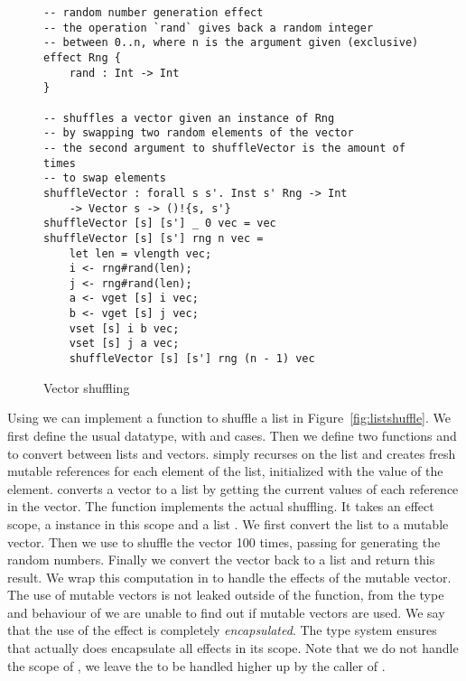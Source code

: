 \begin{figure}[H]
\caption{Vector shuffling}
\begin{verbatim}
-- random number generation effect
-- the operation `rand` gives back a random integer
-- between 0..n, where n is the argument given (exclusive)
effect Rng {
	rand : Int -> Int
}

-- shuffles a vector given an instance of Rng
-- by swapping two random elements of the vector
-- the second argument to shuffleVector is the amount of times
-- to swap elements
shuffleVector : forall s s'. Inst s' Rng -> Int
	-> Vector s -> ()!{s, s'}
shuffleVector [s] [s'] _ 0 vec = vec
shuffleVector [s] [s'] rng n vec =
	let len = vlength vec;
	i <- rng#rand(len);
	j <- rng#rand(len);
	a <- vget [s] i vec;
	b <- vget [s] j vec;
	vset [s] i b vec;
	vset [s] j a vec;
	shuffleVector [s] [s'] rng (n - 1) vec
\end{verbatim}
\label{fig:shuffle}
\end{figure}

Using  we can implement a function to shuffle a list in Figure~\ref{fig:listshuffle}.
We first define the usual  datatype, with  and  cases.
Then we define two functions  and  to convert between lists and vectors.
 simply recurses on the list and creates fresh mutable references for each element of the list, initialized with the value of the element.
 converts a vector to a list by getting the current values of each reference in the vector.
The function  implements the actual shuffling.
It takes an effect scope, a  instance  in this scope and a list .
We first convert the list to a mutable vector.
Then we use  to shuffle the vector 100 times, passing  for generating the random numbers.
Finally we convert the vector back to a list and return this result.
We wrap this computation in  to handle the effects of the mutable vector.
The use of mutable vectors is not leaked outside of the function, from the type and behaviour of  we are unable to find out if mutable vectors are used.
We say that the use of the  effect is completely \emph{encapsulated}.
The type system ensures that  actually does encapsulate all effects in its scope.
Note that we do not handle the scope of , we leave the  to be handled higher up by the caller of .

